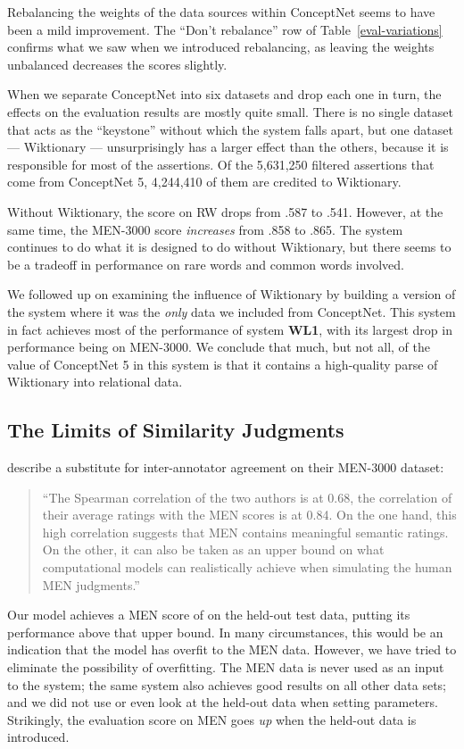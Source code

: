 \documentclass[letterpaper]{article}
\begin{document}
Rebalancing the weights of the data sources within ConceptNet seems to have
been a mild improvement. The ``Don't rebalance'' row of Table~\ref{eval-variations}
confirms what we saw when we introduced rebalancing,
as leaving the weights unbalanced decreases the scores slightly.

When we separate ConceptNet into six datasets and drop each one in turn, the
effects on the evaluation results are mostly quite small. There is no single
dataset that acts as the ``keystone'' without which the system falls apart,
but one dataset --- Wiktionary --- unsurprisingly has a larger effect than the
others, because it is responsible for most of the assertions. Of the 5,631,250
filtered assertions that come from ConceptNet 5, 4,244,410 of them are credited
to Wiktionary.

Without Wiktionary, the score on RW drops from .587 to .541. However, at the
same time, the MEN-3000 score {\em increases} from .858 to .865. The system
continues to do what it is designed to do without Wiktionary, but there seems to
be a tradeoff in performance on rare words and common words involved.

We followed up on examining the influence of Wiktionary by building a version of
the system where it was the {\em only} data we included from ConceptNet. This
system in fact achieves most of the performance of system {\bf WL1}, with its
largest drop in performance being on MEN-3000. We conclude that much, but not
all, of the value of ConceptNet 5 in this system is that it contains a
high-quality parse of Wiktionary into relational data.

\subsection{The Limits of Similarity Judgments}

 describe a substitute for inter-annotator agreement on
their MEN-3000 dataset:

\begin{quote}
``The Spearman correlation of the two authors is at 0.68, the correlation of their
average ratings with the MEN scores is at 0.84. On the one hand, this high
correlation suggests that MEN contains meaningful semantic ratings. On the
other, it can also be taken as an upper bound on what computational models can
realistically achieve when simulating the human MEN judgments.''
\end{quote}

Our model achieves a MEN score of \scoreMEN{} on the
held-out test data, putting its performance above that upper bound. In many
circumstances, this would be an indication that the model has overfit to the
MEN data. However, we have tried to eliminate the possibility of overfitting.
The MEN data is never used as an input to the system; the same system also
achieves good results on all other data sets; and we did not use or even
look at the held-out data when setting parameters. Strikingly, the evaluation
score on MEN goes {\em up} when the held-out data is introduced.
\end{document}
